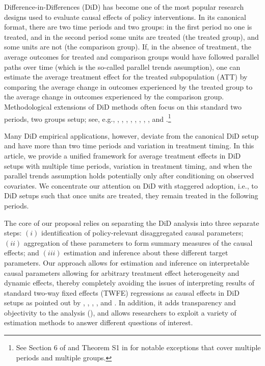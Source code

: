 \documentclass[11pt]{article}%
\theoremstyle{plain}
\numberwithin{sassumption}{section}
\numberwithin{equation}{section}
\begin{document}
Difference-in-Differences (DiD) has become one of the most popular research
designs used to evaluate causal effects of policy interventions. In its
canonical format, there are two time periods and two groups: in the first
period no one is treated, and in the second period some units are treated (the
treated group), and some units are not (the comparison group). If, in the
absence of treatment, the average outcomes for treated and comparison groups
would have followed parallel paths over time (which is the so-called parallel
trends assumption), one can estimate the average treatment effect for the
treated subpopulation (ATT) by comparing the average change in outcomes
experienced by the treated group to the average change in outcomes experienced
by the comparison group. Methodological extensions of DiD methods often focus
on this standard two periods, two groups setup; see, e.g., \cite{Heckman1997,
Heckman1998}, \cite{Abadie2005}, \cite{Athey2006}, \cite{Qin2008},
\cite{Bonhomme2011}, \cite{DeChaisemartin2017}, \cite{Botosaru2017}, 
\cite{Callaway2018}, and \cite{SantAnna2020}.\footnote{See Section 6 of
\cite{Athey2006} and Theorem S1 in \cite{DeChaisemartin2017} for notable
exceptions that cover multiple periods and multiple groups.}

Many DiD empirical applications, however, deviate from the canonical DiD setup
and have more than two time periods and variation in treatment timing. In this
article, we provide a unified framework for average treatment effects in DiD 
setups with multiple time periods, variation in treatment timing, and when the
parallel trends assumption holds potentially only after conditioning on
observed covariates. We concentrate our attention on DiD with staggered
adoption, i.e., to DiD setups such that once units are treated, they remain
treated in the following periods. %

The core of our proposal relies on separating the DiD analysis into three
separate steps: $\left(  i\right)  $ identification of policy-relevant
disaggregated causal parameters; $\left(  ii\right)  $ aggregation of these
parameters to form summary measures of the causal effects; and $\left(
iii\right)  $ estimation and inference about these different target
parameters. Our approach allows for estimation and inference on interpretable 
causal parameters allowing for arbitrary treatment effect heterogeneity and
dynamic effects, thereby completely avoiding the issues of interpreting
results of standard two-way fixed effects (TWFE) regressions as causal effects
in DiD setups as pointed out by \citet{Borusyak2017},
\citet{DeChaisemartin2016}, \citet{Goodman-bacon2017}, \citet{Abraham2018},
and \citet{Athey2018}. In addition, it adds transparency and objectivity to
the analysis (\citet{Rubin2007, Rubin2008}), and allows researchers to exploit
a variety of estimation methods to answer different questions of interest.
\end{document}
